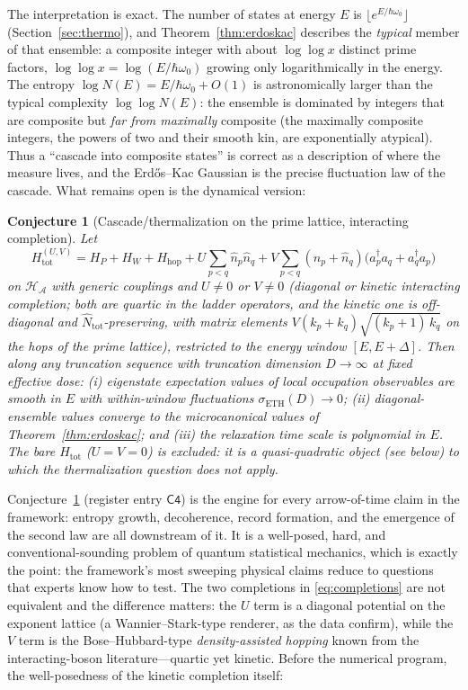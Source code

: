 \documentclass[11pt,a4paper]{article}
\theoremstyle{plain}
\newtheorem{conjecture}{Conjecture}[section]
\theoremstyle{definition}
\theoremstyle{remark}
\newcommand{\Hil}{\mathcal{H}}
\newcommand{\Nhat}{\widehat{N}}
\begin{document}
The interpretation is exact. The number of states at energy $E$ is $\lfloor e^{E/\hbar\omega_{0}}\rfloor$
(Section~\ref{sec:thermo}), and Theorem~\ref{thm:erdoskac} describes the \emph{typical} member
of that ensemble: a composite integer with about $\log\log x$ distinct prime factors,
$\log\log x=\log(E/\hbar\omega_{0})$ growing only logarithmically in the energy. The entropy
$\log N(E)=E/\hbar\omega_{0}+O(1)$ is astronomically larger than the typical complexity
$\log\log N(E)$: the ensemble is dominated by integers that are composite but \emph{far from
maximally} composite (the maximally composite integers, the powers of two and their smooth
kin, are exponentially atypical). Thus a ``cascade into composite states'' is
correct as a description of where the measure lives, and the Erd\H{o}s--Kac Gaussian is the
precise fluctuation law of the cascade. What remains open is the dynamical version:

\begin{conjecture}[Cascade/thermalization on the prime lattice, interacting completion]\label{conj:cascade}
Let
\begin{equation}\label{eq:completions}
H_{\mathrm{tot}}^{(U,V)}=H_{P}+H_{W}+H_{\mathrm{hop}}
+U\!\sum_{p<q}\hat n_{p}\hat n_{q}
+V\!\sum_{p<q}(\hat n_{p}+\hat n_{q})\bigl(a_{p}^{\dagger}a_{q}+a_{q}^{\dagger}a_{p}\bigr)
\end{equation}
on $\Hil_{\mathcal{A}}$ with generic couplings and $U\neq0$ or $V\neq0$ (diagonal or kinetic
interacting completion; both are quartic in the ladder operators, and the kinetic one is
off-diagonal and $\Nhat_{\mathrm{tot}}$-preserving, with matrix elements
$V(k_{p}+k_{q})\sqrt{(k_{p}+1)\,k_{q}}$ on the hops of the prime lattice), restricted to the
energy window $[E,E+\Delta]$. Then along any truncation
sequence with truncation dimension $D\to\infty$ at fixed effective dose: (i) eigenstate expectation values of local
occupation observables are smooth in $E$ with within-window fluctuations
$\sigma_{\mathrm{ETH}}(D)\to0$; (ii) diagonal-ensemble values converge to the microcanonical
values of Theorem~\ref{thm:erdoskac}; and (iii) the relaxation time scale is polynomial in
$E$. The bare $H_{\mathrm{tot}}$ ($U=V=0$) is \emph{excluded}: it is a quasi-quadratic object
(see below) to which the thermalization question does not apply.
\end{conjecture}

Conjecture~\ref{conj:cascade} (register entry $\mathsf{C4}$) is the engine for every
arrow-of-time claim in the framework: entropy growth, decoherence, record formation, and the
emergence of the second law are all downstream of it. It is a well-posed, hard, and
conventional-sounding problem of quantum statistical mechanics, which is exactly the point:
the framework's most sweeping physical claims reduce to questions that experts know how to
test. The two completions in \eqref{eq:completions} are not equivalent and the
difference matters: the $U$ term is a diagonal potential on the exponent lattice (a
Wannier--Stark-type renderer, as the data confirm), while the $V$ term is the
Bose--Hubbard-type \emph{density-assisted hopping} known from the interacting-boson
literature---quartic yet kinetic. Before the numerical program, the well-posedness of the
kinetic completion itself:
\end{document}
